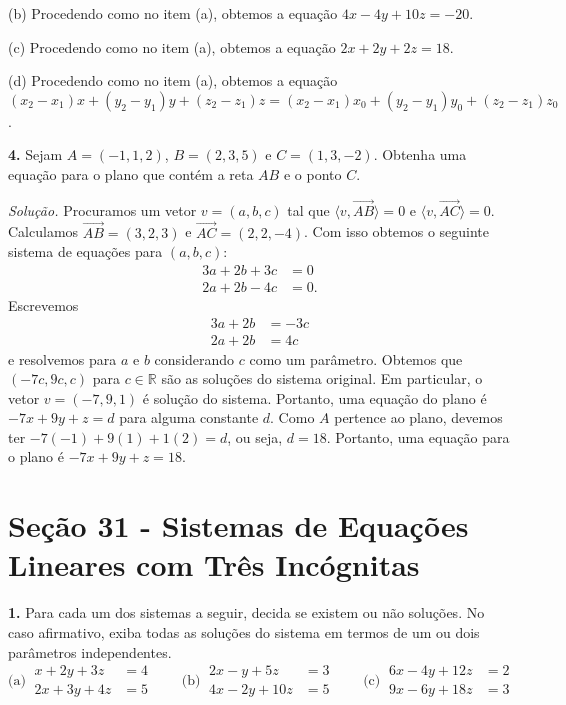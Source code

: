 \documentclass[a4paper,11pt]{article}
\newcommand{\R}{\mathbb{R}}
\begin{document}
(b)
Procedendo como no item (a), obtemos a equação $4x - 4y + 10z = -20$.

(c)
Procedendo como no item (a), obtemos a equação $2x + 2y + 2z = 18$.

(d)
Procedendo como no item (a), obtemos a equação $(x_2 - x_1)x + (y_2 - y_1)y + (z_2 - z_1)z = (x_2 - x_1)x_0 + (y_2 - y_1)y_0 + (z_2 - z_1)z_0$.

\vspace{\baselineskip}

\textbf{4.}
Sejam $A = (-1,1,2)$, $B = (2,3,5)$ e $C = (1,3,-2)$.
Obtenha uma equação para o plano que contém a reta $AB$ e o ponto $C$.

\vspace{\baselineskip}

\emph{Solução.}
Procuramos um vetor $v = (a,b,c)$ tal que $\langle v, \overrightarrow{AB} \rangle = 0$ e $\langle v, \overrightarrow{AC} \rangle = 0$.
Calculamos $\overrightarrow{AB} = (3,2,3)$ e $\overrightarrow{AC} = (2,2,-4)$.
Com isso obtemos o seguinte sistema de equações para $(a,b,c)$:
\begin{align*}
  3a + 2b + 3c & = 0 \\
  2a + 2b - 4c & = 0.
\end{align*}
Escrevemos
\begin{align*}
  3a + 2b & = -3c \\
  2a + 2b & = 4c
\end{align*}
e resolvemos para $a$ e $b$ considerando $c$ como um parâmetro.
Obtemos que $(-7c, 9c, c)$ para $c \in \R$ são as soluções do sistema original.
Em particular, o vetor $v = (-7, 9, 1)$ é solução do sistema.
Portanto, uma equação do plano é $-7x + 9y + z = d$ para alguma constante $d$.
Como $A$ pertence ao plano, devemos ter $-7(-1) + 9(1) + 1(2) = d$, ou seja, $d = 18$.
Portanto, uma equação para o plano é $-7x + 9y + z = 18$.

\section*{Seção 31 - Sistemas de Equações Lineares com Três Incógnitas}

\textbf{1.}
Para cada um dos sistemas a seguir, decida se existem ou não soluções.
No caso afirmativo, exiba todas as soluções do sistema em termos de um ou dois parâmetros independentes.
\[
  \text{(a)} \
  \begin{aligned}
    x + 2y + 3z & = 4 \\
    2x + 3y + 4z & = 5
  \end{aligned}
  \qquad
  \text{(b)} \
  \begin{aligned}
    2x - y + 5z & = 3 \\
    4x - 2y + 10z & = 5
  \end{aligned}
  \qquad
  \text{(c)} \
  \begin{aligned}
    6x - 4y + 12z & = 2 \\
    9x - 6y + 18z & = 3
  \end{aligned}
\]
\end{document}
